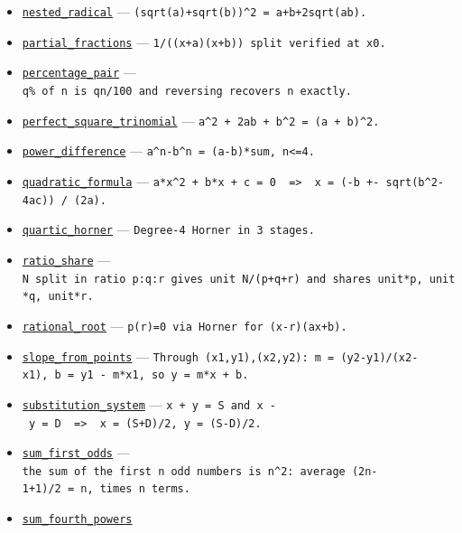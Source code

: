 \documentclass[
  10pt,
]{article}
\begin{document}
\begin{itemize}
  \href{../generation_1/I3/algos_i3.py}{\texttt{median\_five}} ---
  \texttt{median\ of\ five\ distinct\ numbers:\ two\ pair\ partitions\ leave\ three\ candidates;\ sum-min-max\ is\ the\ middle.}
\item
  \href{../generation_1/I1/algos_gen1_big.py}{\texttt{nested\_radical}}
  --- \texttt{(sqrt(a)+sqrt(b))\^{}2\ =\ a+b+2sqrt(ab).}
\item
  \href{../generation_1/I1/algos_gen1_big.py}{\texttt{partial\_fractions}}
  --- \texttt{1/((x+a)(x+b))\ split\ verified\ at\ x0.}
\item
  \href{../generation_1/I3/algos_i3.py}{\texttt{percentage\_pair}} ---
  \texttt{q\%\ of\ n\ is\ qn/100\ and\ reversing\ recovers\ n\ exactly.}
\item
  \href{../tools/prm/algos.py}{\texttt{perfect\_square\_trinomial}} ---
  \texttt{a\^{}2\ +\ 2ab\ +\ b\^{}2\ =\ (a\ +\ b)\^{}2.}
\item
  \href{../generation_1/I1/algos_gen1_big.py}{\texttt{power\_difference}}
  --- \texttt{a\^{}n-b\^{}n\ =\ (a-b)*sum,\ n\textless{}=4.}
\item
  \href{../tools/prm/algos.py}{\texttt{quadratic\_formula}} ---
  \texttt{a*x\^{}2\ +\ b*x\ +\ c\ =\ 0\ \ =\textgreater{}\ \ x\ =\ (-b\ +-\ sqrt(b\^{}2-4ac))\ /\ (2a).}
\item
  \href{../generation_1/I1/algos_gen1_big.py}{\texttt{quartic\_horner}}
  --- \texttt{Degree-4\ Horner\ in\ 3\ stages.}
\item
  \href{../generation_1/I3/algos_i3.py}{\texttt{ratio\_share}} ---
  \texttt{N\ split\ in\ ratio\ p:q:r\ gives\ unit\ N/(p+q+r)\ and\ shares\ unit*p,\ unit*q,\ unit*r.}
\item
  \href{../generation_1/I1/algos_gen1_big.py}{\texttt{rational\_root}}
  --- \texttt{p(r)=0\ via\ Horner\ for\ (x-r)(ax+b).}
\item
  \href{../tools/prm/algos.py}{\texttt{slope\_from\_points}} ---
  \texttt{Through\ (x1,y1),(x2,y2):\ m\ =\ (y2-y1)/(x2-x1),\ b\ =\ y1\ -\ m*x1,\ so\ y\ =\ m*x\ +\ b.}
\item
  \href{../tools/prm/algos.py}{\texttt{substitution\_system}} ---
  \texttt{x\ +\ y\ =\ S\ and\ x\ -\ y\ =\ D\ \ =\textgreater{}\ \ x\ =\ (S+D)/2,\ y\ =\ (S-D)/2.}
\item
  \href{../generation_1/I3/algos_i3.py}{\texttt{sum\_first\_odds}} ---
  \texttt{the\ sum\ of\ the\ first\ n\ odd\ numbers\ is\ n\^{}2:\ average\ (2n-1+1)/2\ =\ n,\ times\ n\ terms.}
\item
  \href{../generation_1/I1/algos_gen1_big.py}{\texttt{sum\_fourth\_powers}}

\end{itemize}
\end{document}
